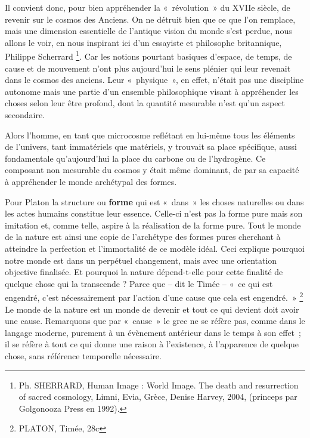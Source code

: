\documentclass[a4paper,12pt]{article}
\begin{document}
Il convient donc, pour bien appréhender la « révolution » du XVIIe siècle, de revenir sur le cosmos des Anciens. On ne détruit bien que ce que l'on remplace, mais une dimension essentielle de l'antique vision du monde s'est perdue, nous allons le voir, en nous inspirant ici d'un essayiste et philosophe britannique, Philippe Scherrard \footnote{Ph. SHERRARD, Human Image : World Image. The death and resurrection of sacred cosmology, Limni, Evia, Grèce, Denise Harvey, 2004, (princeps par Golgonooza Press en 1992).}. Car les notions pourtant basiques d'espace, de temps, de cause et de mouvement n'ont plus aujourd'hui le sens plénier qui leur revenait dans le cosmos des anciens. Leur « physique », en effet, n'était pas une discipline autonome mais une partie d'un ensemble philosophique visant à appréhender les choses selon leur être profond, dont la quantité mesurable n'est qu'un aspect secondaire.

Alors l'homme, en tant que microcosme reflétant en lui-même tous les éléments de l'univers, tant immatériels que matériels, y trouvait sa place spécifique, aussi fondamentale qu’aujourd'hui la place du carbone ou de l'hydrogène. Ce composant non mesurable du cosmos y était même dominant, de par sa capacité à appréhender le monde archétypal des formes. 

Pour Platon la structure ou  \textbf{forme} qui est « dans » les choses naturelles ou dans les actes humains constitue leur essence. Celle-ci n'est pas la forme pure mais son imitation et, comme telle, aspire à la réalisation de la forme pure. Tout le monde de la nature est ainsi une copie de l'archétype des formes pures cherchant à atteindre la perfection et l'immortalité de ce modèle idéal. Ceci explique pourquoi notre monde est dans un perpétuel changement, mais avec une orientation objective finalisée. Et pourquoi la nature dépend-t-elle pour cette finalité de quelque chose qui la transcende ? Parce que – dit le Timée – « ce qui est engendré, c'est nécessairement par l'action d'une cause que cela est engendré. » \footnote{PLATON, Timée, 28c} Le monde de la nature est un monde de devenir et tout ce qui devient doit avoir une cause. Remarquons que par « cause » le grec ne se réfère pas, comme dans le langage moderne, purement à un évènement antérieur dans le temps à son effet ; il se réfère à tout ce qui donne une raison à l'existence, à l'apparence de quelque chose, sans référence temporelle nécessaire. 
\end{document}
